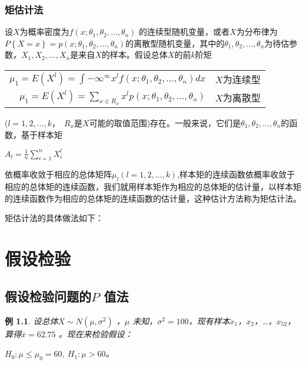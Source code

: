 \documentclass[11pt]{book}
\newtheorem{exercise}{\hspace{2em}\textbf{例}}[section]
\newcounter{#2}
\newcounter{#2}[#1]
\numberwithin{#2}{#1}
\begin{document}
	\subsection{矩估计法}
	设$X$为概率密度为$f(x;\theta_1,\theta_2,\dots,\theta_n)$ 的连续型随机变量，或者$X$为分布律为$P\left\lbrace X=x\right\rbrace =p(x;\theta_1,\theta_2,\dots,\theta_n)$的离散型随机变量，其中的$\theta_1,\theta_2,\dots,\theta_n$为待估参数，$X_1,X_2,\dots,X_n$是来自$X$的样本。假设总体$X$的前$k$阶矩
	\begin{center}
		\begin{tabular}{r l}
			$ \mu_1 = E(X^l) = \int{-\infty}^{\infty} x^l f(x;\theta_1,\theta_2,\dots,\theta_n) dx$ & $X$为连续型\\
			$ \mu_1 = E(X^l) = \sum\limits_{x \in R_x} x^l p(x;\theta_1,\theta_2,\dots,\theta_n)$  & $X$为离散型\\
		\end{tabular}
	\end{center}
	($l=1,2,\dots,k$，\ $R_x$是$X$可能的取值范围)存在。一般来说，它们是$\theta_1,\theta_2,\dots,\theta_n$的函数，基于样本矩
	\begin{center}
		$ A_l= \frac{1}{n}\sum\limits_{i=1}^n X_i^l $
	\end{center}
依概率收敛于相应的总体矩阵$\mu_l(l=1,2,\dots,k)$,样本矩的连续函数依概率收敛于相应的总体矩的连续函数，我们就用样本矩作为相应的总体矩的估计量，以样本矩的连续函数作为相应的总体矩的连续函数的估计量，这种估计方法称为矩估计法。

矩估计法的具体做法如下：






	\chapter{假设检验}
	\section{假设检验问题的$ P $ 值法}
	\begin{exercise}
	设总体$ X \sim N(\mu ,\sigma ^{2})$ ，$ \mu $ 未知，$ \sigma ^{2}=100 $，现有样本$ x_1 $，$ x_2 $，\dots ，$ x_{52} $，算得$ \overline{x} = 62.75$ 。现在来检验假设：
	\begin{center}
		$ H_0:\mu \le \mu _0=60,\ H_1 :\mu >60 $。
	\end{center}
\end{exercise}
\end{document}
